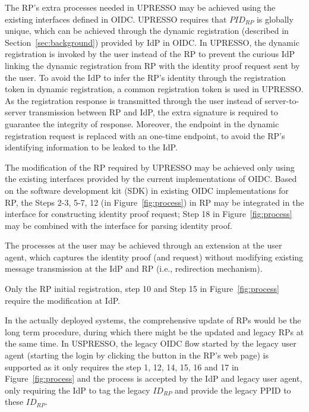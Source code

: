 The RP's extra processes needed in UPRESSO may be achieved using the existing interfaces defined in OIDC.
UPRESSO requires that $PID_{RP}$ is globally unique, which can be achieved through the dynamic registration (described in Section~\ref{sec:background}) provided by IdP in OIDC.
In UPRESSO, the dynamic registration is invoked by the user instead of the RP to prevent the curious IdP linking  the dynamic registration from RP with the identity proof request sent by the user.
To avoid the IdP to infer the RP's identity through the registration token in dynamic registration,
a common  registration token is used in UPRESSO.
As the registration response is transmitted through the user instead of server-to-server transmission between RP and IdP, the extra signature is required to guarantee the integrity of response. Moreover, the endpoint in the dynamic registration request is replaced with an one-time endpoint, to avoid the RP's identifying information to be leaked to the IdP.


The modification of the RP required by UPRESSO may be achieved only using the existing interfaces provided by the current implementations of OIDC.
Based on the software development kit (SDK) in existing OIDC implementations for RP, the Steps 2-3, 5-7, 12 (in Figure~\ref{fig:process}) in RP may be integrated in the interface for constructing identity proof request;
Step 18 in Figure~\ref{fig:process} may be combined with the interface for  parsing identity proof.

The processes at the user may be achieved through an extension at the user agent,
which captures the identity proof (and request)  without modifying existing message transmission at the IdP and RP (i.e., redirection mechanism). %


Only the RP initial registration, step 10 and Step 15 in Figure~\ref{fig:process} require the modification at IdP.

In the actually deployed systems, the comprehensive update of RPs would be the long term procedure, during which there might be the updated and legacy RPs at the same time. In USPRESSO, the legacy OIDC flow started by the legacy user agent (starting the login by clicking the button in the RP's web page) is supported as it only requires the step 1, 12, 14, 15, 16 and 17 in Figure~\ref{fig:process} and the process is accepted by the IdP and legacy user agent, only requiring the IdP to tag the legacy $ID_{RP}$ and provide the legacy PPID to these $ID_{RP}$.


